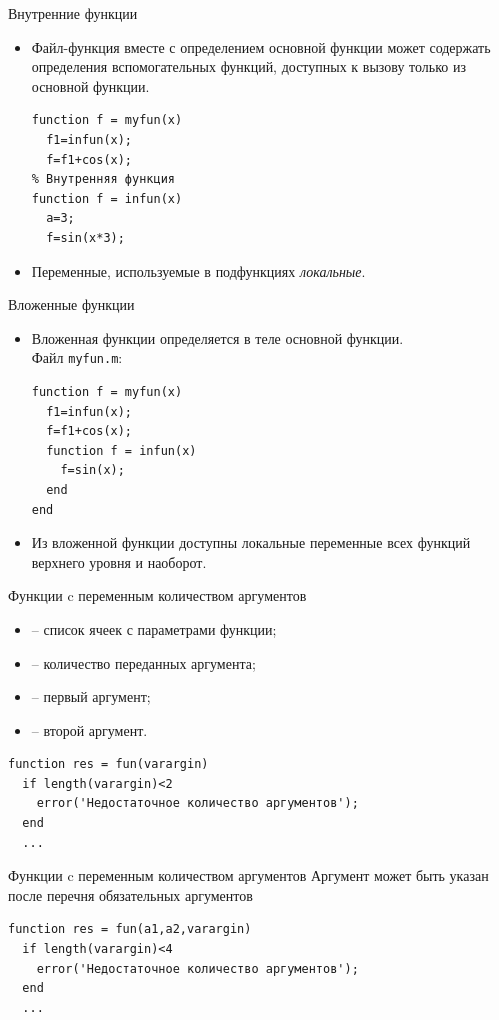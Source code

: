 \documentclass[11pt, compress]{beamer}
\begin{document}
\begin{frame}[fragile]{Внутренние функции}
\begin{itemize}
\item Файл-функция вместе с определением основной функции может содержать определения вспомогательных функций, доступных к вызову только из основной функции. 
\begin{lstlisting}     
function f = myfun(x)
  f1=infun(x);
  f=f1+cos(x);
% Внутренняя функция
function f = infun(x)
  a=3;
  f=sin(x*3);
\end{lstlisting}
  \item Переменные, используемые в подфункциях \emph{локальные}.
\end{itemize}  
\end{frame}

\begin{frame}[fragile]{Вложенные функции}
\begin{itemize}
\item Вложенная функции определяется в теле основной функции. \\
Файл {\tt myfun.m}:
\begin{lstlisting}
function f = myfun(x)
  f1=infun(x);
  f=f1+cos(x);
  function f = infun(x)
    f=sin(x);
  end
end    
\end{lstlisting}
 \item Из вложенной функции  доступны локальные переменные всех функций верхнего уровня и наоборот.
\end{itemize}
\end{frame}

\begin{frame}[fragile]{Функции c переменным количеством аргументов}
\begin{itemize}
  \item {} -- список ячеек с параметрами функции;
  \item {} -- количество переданных аргумента;
  \item {} -- первый аргумент;
  \item {} -- второй аргумент.
\end{itemize}  
\begin{lstlisting}
function res = fun(varargin)
  if length(varargin)<2
    error('Недостаточное количество аргументов');
  end
  ...
\end{lstlisting}
\end{frame}

\begin{frame}[fragile]{Функции c переменным количеством аргументов}
Аргумент  может быть указан после перечня обязательных аргументов 
\begin{lstlisting}
function res = fun(a1,a2,varargin)
  if length(varargin)<4
    error('Недостаточное количество аргументов');
  end
  ...
\end{lstlisting}
\end{frame}
\end{document}
